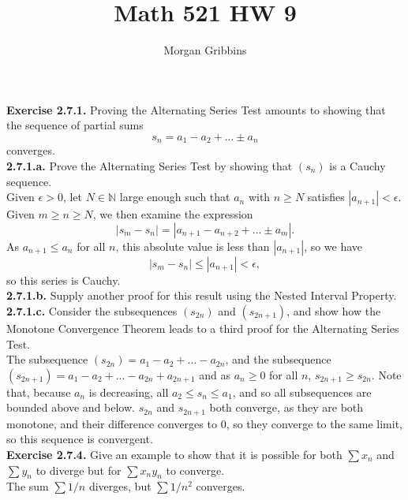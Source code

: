\documentclass[12pt,letterpaper]{article}
\title{Math 521 HW 9}
\author{Morgan Gribbins}
\date{}
\begin{document}
	
\maketitle

\textbf{Exercise 2.7.1.} Proving the Alternating Series Test amounts to showing that the sequence of partial sums \[s_{n} = a_{1} - a_{2} + ... \pm a_{n}\] converges. \\

\textbf{2.7.1.a.} Prove the Alternating Series Test by showing that \((s_{n})\) is a Cauchy sequence. \\

Given \(\epsilon > 0\), let \(N \in \mathbb{N}\) large enough such that \(a_{n}\) with \(n \geq N\) satisfies \(|a_{n+1}| < \epsilon\). Given \(m \geq n \geq N\), we then examine the expression \[|s_{m} - s_{n}| = |a_{n+1} - a_{n+2} + ... \pm a_{m}|.\] As \(a_{n+1} \leq a_{n}\) for all \(n\), this absolute value is less than \(|a_{n+1}|\), so we have \[|s_{m} - s_{n}| \leq |a_{n+1}| < \epsilon,\] so this series is Cauchy. \\

\textbf{2.7.1.b.} Supply another proof for this result using the Nested Interval Property. \\



\textbf{2.7.1.c.} Consider the subsequences \((s_{2n})\) and \((s_{2n+1})\), and show how the Monotone Convergence Theorem leads to a third proof for the Alternating Series Test. \\

The subsequence \((s_{2n}) = a_{1} - a_{2} + ... - a_{2n}\), and the subsequence \((s_{2n+1}) = a_{1} - a_{2} + ... - a_{2n} + a_{2n+1}\) and as \(a_{n} \geq 0\) for all \(n\), \(s_{2n+1} \geq s_{2n}\). Note that, because \(a_{n}\) is decreasing, all \(a_{2} \leq s_{n} \leq a_{1}\), and so all subsequences are bounded above and below. \(s_{2n}\) and \(s_{2n+1}\) both converge, as they are both monotone, and their difference converges to \(0\), so they converge to the same limit, so this sequence is convergent. \\

\textbf{Exercise 2.7.4.} Give an example to show that it is possible for both \(\sum x_{n}\) and \(\sum y_{n}\) to diverge but for \(\sum x_{n}y_{n}\) to converge. \\

The sum \(\sum 1/n\) diverges, but \(\sum 1/n^{2}\) converges. \\
\end{document}
